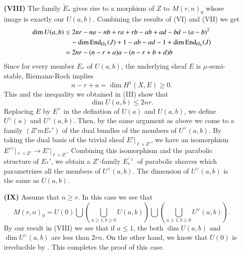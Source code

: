 \begin{itemize}
\item[\bf(VIII)] The family $\tilde{E}_{*}$ gives rise to a morphism of $Z$ to $M(r, n)_{0}$ whose image is exactly our $U(a,b)$. Combining the results of (VI) and (VII) we get
{\small
\begin{equation*}
\begin{split}
\dim U(a, b) &\leq 2nr -na -nb + ra + rb -ab +ad-bd-(a-b)^{2}\\
             & \quad -\dim \operatorname{End}_{\mathcal{O}_{X}}(J) + 1 -ab -ad -1 + \dim \operatorname{End}_{\mathcal{O}_{X}}(J)\\
             &= 2nr -(n-r +a)a-(n-r +b + d)b 
\end{split}
\end{equation*}}\relax
Since for every member $E_{*}$ of $U(a, b)$, the underlying sheaf $E$ is $\mu$-semi-stable, Riemann-Roch implies
$$
n-r + a = \dim H^{1}(X, E) \geq 0.
$$
This and the inequality we obtained in (III) show that
$$
\dim U(a, b) \leq 2nr.
$$
Replacing $E$ by $E^{\vee}$ in the definition of $U(a)$ and $U(a, b)$, we  define $U^{\vee}(a)$ and $U^{\vee}(a, b)$. Then, by the same argument as above we come to a family $(Z'm E_{*}')$ of the dual bundles of the members of $U^{\vee}(a, b)$. By taking the dual basis of the trivial sheaf $E'|_{\ell \times Z'}$, we have an isomorphism $E'^{\vee}|_{\ell \times Z'} \rightarrow E'|_{\ell \times Z'}$. Combining this isomorphism and the parabolic structure of $E_{*}'$, we obtain a $Z'$-family $E_{*}^{'\vee}$ of parabolic sheaves which parametrizes all the members of $U^{\vee}(a, b)$. The dimension of $U^{\vee}(a, b)$ is the same as $U(a, b)$.

\item [\bf(IX)] Assume that $n \geq r$. In this case we see that
$$
M(r, n)_{0} = U(0)\bigcup\left(\bigcup\limits_{a \geq 1, b \geq 0} U(a, b)\right) \bigcup \left(\bigcup\limits_{a \geq 1, b \geq 0} U^{\vee}(a, b)\right).
$$
By our result in (VIII) we see that if $a \leq 1$, the both $\dim U(a, b)$ and $\dim U^{\vee}(a,b)$ are less than $2rn$. On the other hand, we know that $U(0)$ is irreducible by \cite{chap12-key3}. This completes the proof of this case.

\newpage


\end{itemize}
